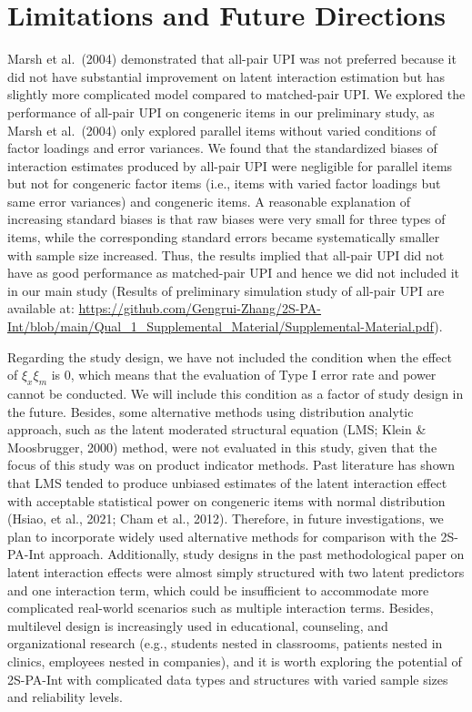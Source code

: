 \documentclass[
  man]{apa6}
\begin{document}
\hypertarget{limitations-and-future-directions}{%
\section{Limitations and Future Directions}\label{limitations-and-future-directions}}

Marsh et al.~(2004) demonstrated that all-pair UPI was not preferred because it did not have substantial improvement on latent interaction estimation but has slightly more complicated model compared to matched-pair UPI. We explored the performance of all-pair UPI on congeneric items in our preliminary study, as Marsh et al.~(2004) only explored parallel items without varied conditions of factor loadings and error variances. We found that the standardized biases of interaction estimates produced by all-pair UPI were negligible for parallel items but not for congeneric factor items (i.e., items with varied factor loadings but same error variances) and congeneric items. A reasonable explanation of increasing standard biases is that raw biases were very small for three types of items, while the corresponding standard errors became systematically smaller with sample size increased. Thus, the results implied that all-pair UPI did not have as good performance as matched-pair UPI and hence we did not included it in our main study (Results of preliminary simulation study of all-pair UPI are available at: \url{https://github.com/Gengrui-Zhang/2S-PA-Int/blob/main/Qual_1_Supplemental_Material/Supplemental-Material.pdf}).

Regarding the study design, we have not included the condition when the effect of \(\xi_{x}\xi_{m}\) is 0, which means that the evaluation of Type I error rate and power cannot be conducted. We will include this condition as a factor of study design in the future. Besides, some alternative methods using distribution analytic approach, such as the latent moderated structural equation (LMS; Klein \& Moosbrugger, 2000) method, were not evaluated in this study, given that the focus of this study was on product indicator methods. Past literature has shown that LMS tended to produce unbiased estimates of the latent interaction effect with acceptable statistical power on congeneric items with normal distribution (Hsiao, et al., 2021; Cham et al., 2012). Therefore, in future investigations, we plan to incorporate widely used alternative methods for comparison with the 2S-PA-Int approach. Additionally, study designs in the past methodological paper on latent interaction effects were almost simply structured with two latent predictors and one interaction term, which could be insufficient to accommodate more complicated real-world scenarios such as multiple interaction terms. Besides, multilevel design is increasingly used in educational, counseling, and organizational research (e.g., students nested in classrooms, patients nested in clinics, employees nested in companies), and it is worth exploring the potential of 2S-PA-Int with complicated data types and structures with varied sample sizes and reliability levels.
\end{document}
